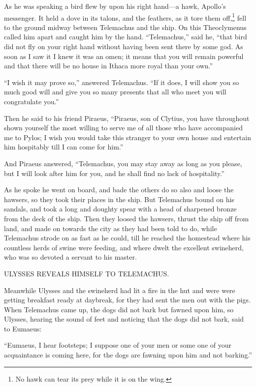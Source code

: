 As he was speaking a bird flew by upon his right hand—a hawk, Apollo’s
messenger. It held a dove in its talons, and the feathers, as it tore them
off,\footnote{No hawk can tear its prey while it is on the wing.} fell to
the ground midway between Telemachus and the ship. On this Theoclymenus called
him apart and caught him by the hand. “Telemachus,” said he, “that bird did not
fly on your right hand without having been sent there by some god. As soon as I
saw it I knew it was an omen; it means that you will remain powerful and that
there will be no house in Ithaca more royal than your own.”

“I wish it may prove so,” answered Telemachus. “If it does, I will show you so
much good will and give you so many presents that all who meet you will
congratulate you.”

Then he said to his friend Piraeus, “Piraeus, son of Clytius, you have
throughout shown yourself the most willing to serve me of all those who have
accompanied me to Pylos; I wish you would take this stranger to your own house
and entertain him hospitably till I can come for him.”

And Piraeus answered, “Telemachus, you may stay away as long as you please, but
I will look after him for you, and he shall find no lack of hospitality.”

As he spoke he went on board, and bade the others do so also and loose the
hawsers, so they took their places in the ship. But Telemachus bound on his
sandals, and took a long and doughty spear with a head of sharpened bronze from
the deck of the ship. Then they loosed the hawsers, thrust the ship off from
land, and made on towards the city as they had been told to do, while
Telemachus strode on as fast as he could, till he reached the homestead where
his countless herds of swine were feeding, and where dwelt the excellent
swineherd, who was so devoted a servant to his master.


ULYSSES REVEALS HIMSELF TO TELEMACHUS.

Meanwhile Ulysses and the swineherd had lit a fire in the hut and were were
getting breakfast ready at daybreak, for they had sent the men out with the
pigs. When Telemachus came up, the dogs did not bark but fawned upon him, so
Ulysses, hearing the sound of feet and noticing that the dogs did not bark,
said to Eumaeus:

“Eumaeus, I hear footsteps; I suppose one of your men or some one of your
acquaintance is coming here, for the dogs are fawning upon him and not
barking.”

